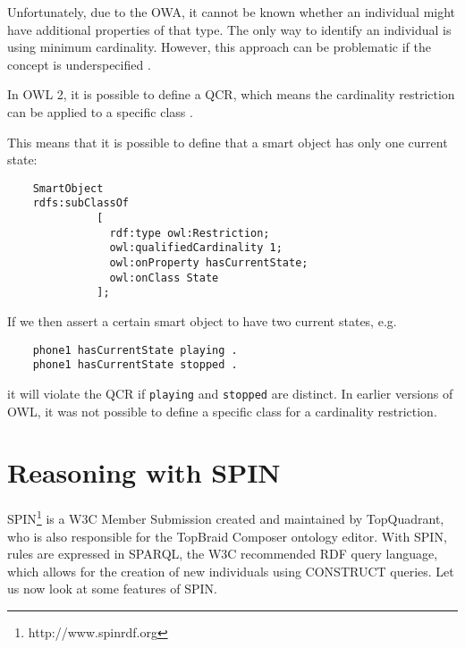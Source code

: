 Unfortunately, due to the \ac{OWA}, it cannot be known whether an individual might have additional properties of that type. The only way to identify an individual is using minimum cardinality. However, this approach can be problematic if the concept is underspecified \cite{Hoekstra2008}.



In \ac{OWL} 2, it is possible to define a \ac{QCR}, which means the cardinality restriction can be applied to a specific class \cite{Hebeler2009}. %


 This means that it is possible to define that a smart object has only one current state:

\begin{verbatim}
	SmartObject
	rdfs:subClassOf
	          [
	            rdf:type owl:Restriction;
	            owl:qualifiedCardinality 1;
	            owl:onProperty hasCurrentState;
	            owl:onClass State
	          ];
\end{verbatim}

If we then assert a certain smart object to have two current states, e.g.

\begin{verbatim}
	phone1 hasCurrentState playing .
	phone1 hasCurrentState stopped .
\end{verbatim}

it will violate the \ac{QCR} if \texttt{playing} and \texttt{stopped} are distinct. In earlier versions of \ac{OWL}, it was not possible to define a specific class for a cardinality restriction.





\section{Reasoning with SPIN}
\label{SPIN}
\ac{SPIN}\footnote{http://www.spinrdf.org} is a W3C Member Submission created and maintained by \mbox{TopQuadrant}, who is also responsible for the TopBraid Composer ontology editor. With \ac{SPIN}, rules are expressed in \ac{SPARQL}, the W3C recommended \ac{RDF} query language, which allows for the creation of new individuals using CONSTRUCT queries. Let us now look at some features of \ac{SPIN}.


